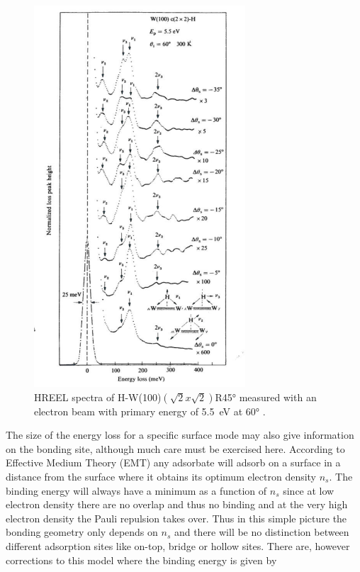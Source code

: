 \begin{figure}[h!]
	\begin{center}
	\includegraphics[scale=4.2]{figures/08_06.png}
	\caption{HREEL spectra of H-W(100)$(\sqrt{2}x\sqrt{2})$R\ang{45} measured with an electron beam with primary energy of \SI{5.5}{\electronvolt} at \ang{60} \cite{Barnes}.}
	\label{fig:hwhreels}
	\end{center}
\end{figure}

The size of the energy loss for a specific surface mode may also give information on the bonding site, although much care must be exercised here. According to Effective Medium Theory (EMT) any adsorbate will adsorb on a surface in a distance from the surface where it obtains its optimum electron density $n_s$. The binding energy will always have a minimum as a function of $n_s$ since at low electron density there are no overlap and thus no binding and at the very high electron density the Pauli repulsion takes over. Thus in this simple picture the bonding geometry only depends on $n_s$ and there will be no distinction between different adsorption sites like on-top, bridge or hollow sites. There are, however corrections to this model where the binding energy is  given by  

